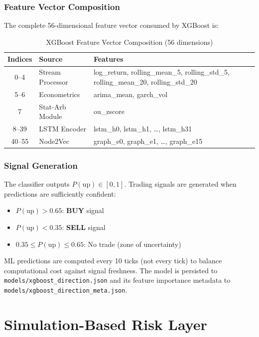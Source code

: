 \documentclass[letterpaper,11pt]{report}
\begin{document}
\subsection{Feature Vector Composition}

The complete 56-dimensional feature vector consumed by XGBoost is:

\begin{table}[h]
\centering
\caption{XGBoost Feature Vector Composition (56 dimensions)}
\begin{tabular}{clp{7cm}}
\toprule
\textbf{Indices} & \textbf{Source} & \textbf{Features} \\
\midrule
0--4 & Stream Processor & log\_return, rolling\_mean\_5, rolling\_std\_5, rolling\_mean\_20, rolling\_std\_20 \\
5--6 & Econometrics & arima\_mean, garch\_vol \\
7 & Stat-Arb Module & ou\_zscore \\
8--39 & LSTM Encoder & lstm\_h0, lstm\_h1, \ldots, lstm\_h31 \\
40--55 & Node2Vec & graph\_e0, graph\_e1, \ldots, graph\_e15 \\
\bottomrule
\end{tabular}
\end{table}

\subsection{Signal Generation}

The classifier outputs $P(\text{up}) \in [0, 1]$. Trading signals are generated when predictions are sufficiently confident:
\begin{itemize}
    \item $P(\text{up}) > 0.65$: \textbf{BUY} signal
    \item $P(\text{up}) < 0.35$: \textbf{SELL} signal
    \item $0.35 \leq P(\text{up}) \leq 0.65$: No trade (zone of uncertainty)
\end{itemize}

ML predictions are computed every 10 ticks (not every tick) to balance computational cost against signal freshness. The model is persisted to \texttt{models/xgboost\_direction.json} and its feature importance metadata to \texttt{models/xgboost\_direction\_meta.json}.


\chapter{Simulation-Based Risk Layer}
\end{document}
